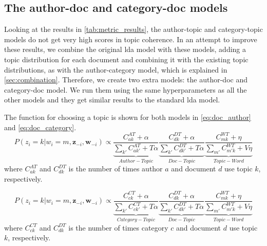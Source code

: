 \subsection{The author-doc and category-doc models}\label{subsec:app_exten_models}
Looking at the results in \autoref{tab:metric_results}, the author-topic and category-topic models do not get very high scores in topic coherence.
In an attempt to improve these results, we combine the original \gls{lda} model with these models, adding a topic distribution for each document and combining it with the existing topic distributions, as with the author-category model, which is explained in \autoref{sec:combination}.
Therefore, we create two extra models: the author-doc and category-doc model.
We run them using the same hyperparameters as all the other models and they get similar results to the standard \gls{lda} model.

The function for choosing a topic is shown for both models in \autoref{eq:doc_author} and \autoref{eq:doc_category}. 
\begin{equation}\label{eq:doc_author}
	P(z_i = k |w_i = m, \boldsymbol{z}_{-i}, \boldsymbol{w}_{-i}) \propto 
	\underbrace{\frac{C^{AT}_{ak} + \alpha}{\sum_{k'} C^{AT}_{ak'} + T\alpha}}_{Author-Topic}
	\underbrace{\frac{C^{DT}_{dk} + \alpha}{\sum_{k'} C^{DT}_{dk'} + T\alpha}}_{Doc-Topic}
	\underbrace{\frac{C^{WT}_{mk} + \eta}{\sum_{m'} C^{WT}_{m'k} + V\eta}}_{Topic-Word}
\end{equation}
where $C^{AT}_{ak}$ and $C^{DT}_{dk}$ is the number of times author $a$ and document $d$ use topic $k$, respectively.

\begin{equation}\label{eq:doc_category}
	P(z_i = k |w_i = m, \boldsymbol{z}_{-i}, \boldsymbol{w}_{-i}) \propto
	\underbrace{\frac{C^{CT}_{ck} + \alpha}{\sum_{k'} C^{CT}_{ck'} + T\alpha}}_{Category-Topic}
	\underbrace{\frac{C^{DT}_{dk} + \alpha}{\sum_{k'} C^{DT}_{dk'} + T\alpha}}_{Doc-Topic}
	\underbrace{\frac{C^{WT}_{mk} + \eta}{\sum_{m'} C^{WT}_{m'k} + V\eta}}_{Topic-Word}
\end{equation}
where $C^{CT}_{ck}$ and $C^{DT}_{dk}$ is the number of times category $c$ and document $d$ use topic $k$, respectively.

